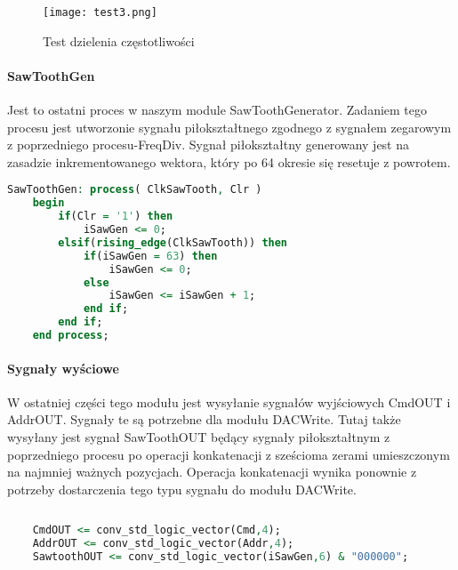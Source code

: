 \documentclass[11pt]{report}
\begin{document}
    	
    \begin{figure}[h]
    	\centering
    	\texttt{[image: test3.png]}
    	\caption{Test dzielenia częstotliwości}
	    \label{fig:FreqDiv}
    \end{figure}
    
    \newpage
    
	\paragraph{SawToothGen} 	  
	
	Jest to ostatni proces w naszym module SawToothGenerator. Zadaniem tego procesu jest utworzonie sygnału piłokształtnego zgodnego z sygnałem zegarowym z poprzedniego procesu-FreqDiv. Sygnał piłokształtny generowany jest na zasadzie inkrementowanego wektora, który po 64 okresie się resetuje z powrotem. 
	
    \vspace{10mm} 
    	
    \begin{lstlisting}[label=sawtoothgen,caption=Process: FreqDiv,frame=tb,language=vhdl]
    SawToothGen: process( ClkSawTooth, Clr )
    begin
        if(Clr = '1') then
            iSawGen <= 0;
        elsif(rising_edge(ClkSawTooth)) then
            if(iSawGen = 63) then
                iSawGen <= 0;
            else
                iSawGen <= iSawGen + 1;
            end if;
        end if;
    end process;
    \end{lstlisting}
    	
	
    \vspace{10mm} 
	
	\paragraph{Sygnały wyściowe} 
	
	W ostatniej części tego modułu jest wysyłanie sygnałów wyjściowych CmdOUT i AddrOUT. Sygnały te są potrzebne dla modułu DACWrite. Tutaj także wysyłany jest sygnał SawToothOUT będący sygnały piłokształtnym z poprzedniego procesu po operacji konkatenacji z sześcioma zerami umieszczonym na najmniej ważnych pozycjach. Operacja konkatenacji wynika ponownie z potrzeby dostarczenia tego typu sygnału do modułu DACWrite.
	
    \vspace{10mm} 
        
    \begin{lstlisting}[label=sawtooth-in,caption=Sygnały wyściowe,frame=tb,language=vhdl]
    
    CmdOUT <= conv_std_logic_vector(Cmd,4);
    AddrOUT <= conv_std_logic_vector(Addr,4);
    SawtoothOUT <= conv_std_logic_vector(iSawGen,6) & "000000";
    \end{lstlisting}
    \newpage
\end{document}
